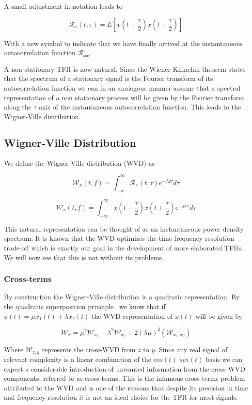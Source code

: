 A small adjustment in notation leads to

$$ \mathcal{R}_{x}(t, \tau) = E\left[x\left(t - \frac{\tau}{2}\right)x\left(t + \frac{\tau}{2}\right)\right] $$

With a new symbol to indicate that we have finally arrived at the instantaneous
autocorrelation function $\mathcal{R}_{xx}$.

A non stationary TFR is now natural. Since the
Wiener-Khinchin theorem states that the spectrum of a stationary signal is the
Fourier transform of its autocorrelation function we can in an analogous manner
assume that a spectral representation of a non stationary process will be given
by the Fourier transform along the $\tau$ axis of the instantaneous
autocorrelation function. This leads to the Wigner-Ville distribution.

\subsection{Wigner-Ville Distribution}

We define the Wigner-Ville distribution (WVD) as

$$ \mathcal{W}_{x}(t, f) =  \int_{-\infty}^{\infty} \mathcal{R}_{x}(t, \tau) e^{-j\omega \tau}d\tau$$

$$ \mathcal{W}_{x}(t, f) =  \int_{-\infty}^{\infty} x\left(t - \frac{\tau}{2}\right)x\left(t + \frac{\tau}{2}\right) e^{-j\omega \tau}d\tau$$

This natural representation can be thought of as an instantaneous power density
spectrum. It is known that the WVD optimizes the time-frequency resolution
trade-off\cite{tfr_comparison} which is exactly our goal in the development of
more elaborated TFRs. We will now see that this is not without its problems.

\subsubsection{Cross-terms}

By construction the Wigner-Ville distribution is a quadratic representation. By
the quadratic superposition principle~\cite{quadratic_freq_representation} we
know that if $x(t) = \mu x_1(t) + \lambda x_2(t)$ the WVD representation of
$x(t)$ will be given by

$$ \mathcal{W}_{x} = \mu^2\mathcal{W}_{x_1} + \lambda^2\mathcal{W}_{x_2} + 2(\lambda\mu)^2(\mathcal{W}_{x_1 , x_2})$$

Where $\mathcal{W}_{z, y}$ represents the cross-WVD from $z$ to $y$. Since any
real signal of relevant complexity is a linear combination of the $cos(t)$
$sin(t)$ basis we can expect a considerable introduction of unwanted
information from the cross-WVD components, referred to as cross-terms. This is
the infamous cross-terms problem attributed to the WVD and is one of the
reasons that despite its precision in time and frequency resolution it is not
an ideal choice for the TFR for most signals.

